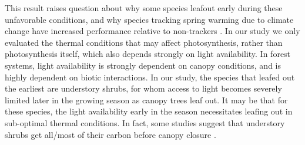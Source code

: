 \documentclass{article}[12pt]
\begin{document}
This result raises question about why some species leafout early during these unfavorable conditions, and why species tracking spring warming due to climate change have increased performance relative to non-trackers \citep{Cleland2012}. In our study we only evaluated the thermal conditions that may affect photosynthesis, rather than photosynthesis itself, which also depends strongly on light availability. In forest systems, light availability is strongly dependent on canopy conditions, and is highly dependent on biotic interactions. In our study, the species that leafed out the earliest are understory shrubs, for whom access to light becomes severely limited later in the growing season as canopy trees leaf out. It may be that for these species, the light availability early in the season necessitates leafing out in sub-optimal thermal conditions. In fact, some studies suggest that understory shrubs get all/most of their carbon before canopy closure \citep{AUGSPURGER2005}.
\end{document}
